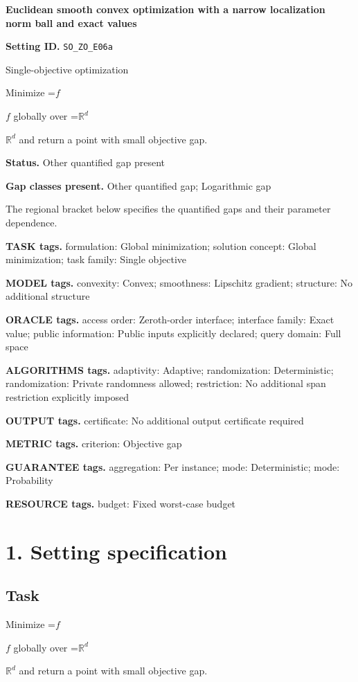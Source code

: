 \documentclass[10pt,a4paper]{article}
\newcommand{\AtlasMath}[1]{\par\begingroup\centering\setbox0=\hbox{$\displaystyle #1$}\ifdim\wd0>1.4\linewidth\typeout{ATLAS WIDE FORMULA: \the\wd0}\fi\ifdim\wd0>\linewidth\resizebox{\linewidth}{!}{\box0}\else\box0\fi\par\endgroup}
\newcommand{\AtlasInlineMath}[1]{\begingroup\setbox0=\hbox{$#1$}\ifdim\wd0>.4\linewidth\endgroup\AtlasMath{#1}\else\endgroup$#1$\fi}
\begin{document}
\raggedright

{\LARGE\bfseries\sffamily\color{AtlasNavy} Euclidean smooth convex optimization with a narrow localization norm ball and exact values\par}\vspace{5pt}
\textbf{Setting ID.} \texttt{SO\_\allowbreak{}ZO\_\allowbreak{}E06a}

Single-objective optimization

Minimize \AtlasInlineMath{f} globally over \AtlasInlineMath{\mathbb{R}^d} and return a point with small objective gap.

\textbf{Status.} Other quantified gap present

\textbf{Gap classes present.} Other quantified gap; Logarithmic gap

The regional bracket below specifies the quantified gaps and their parameter dependence.

\textbf{TASK tags.} formulation: Global minimization; solution concept: Global minimization; task family: Single objective

\textbf{MODEL tags.} convexity: Convex; smoothness: Lipschitz gradient; structure: No additional structure

\textbf{ORACLE tags.} access order: Zeroth-order interface; interface family: Exact value; public information: Public inputs explicitly declared; query domain: Full space

\textbf{ALGORITHMS tags.} adaptivity: Adaptive; randomization: Deterministic; randomization: Private randomness allowed; restriction: No additional span restriction explicitly imposed

\textbf{OUTPUT tags.} certificate: No additional output certificate required

\textbf{METRIC tags.} criterion: Objective gap

\textbf{GUARANTEE tags.} aggregation: Per instance; mode: Deterministic; mode: Probability

\textbf{RESOURCE tags.} budget: Fixed worst-case budget

\section{1. Setting specification}
\subsection{Task}
Minimize \AtlasInlineMath{f} globally over \AtlasInlineMath{\mathbb{R}^d} and return a point with small objective gap.
\end{document}
